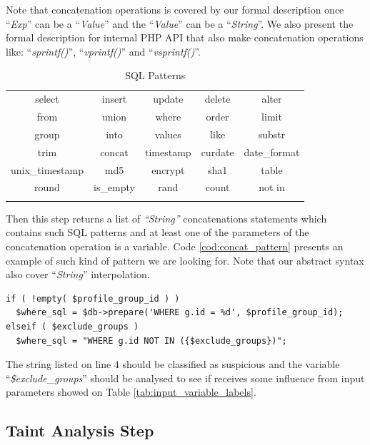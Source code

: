 Note that concatenation operations is covered by our formal description once ``\textit{Exp}'' can be a ``\textit{Value}'' and the ``\textit{Value}'' can be a ``\textit{String}''. We also present the formal description for internal PHP API that also make concatenation operations like: ``\textit{sprintf()}'', ``\textit{vprintf()}'' and ``\textit{vsprintf()}''.

\begin{table}[ht] 
\caption{SQL Patterns}
\centering
\begin{tabular}{c c c c c}
\hline\hline
select & insert & update & delete & alter \\
from & union & where & order & limit \\
group & into & values & like & substr \\
trim & concat & timestamp & curdate & date\_format \\
unix\_timestamp & md5 & encrypt & sha1 & table \\
round & is\_empty & rand & count & not in \\
\hline
\label{tab:sql_patterns}
\end{tabular}
\end{table}

Then this step returns a list of \textit{``String''} concatenations statements  which contains such SQL patterns and at least one of the parameters of the concatenation operation is a variable. Code \ref{cod:concat_pattern} presents an example of such kind of pattern we are looking for. Note that our abstract syntax also cover ``\textit{String}'' interpolation.

\begin{lstlisting}[caption=String concatenation statement pattern, label=cod:concat_pattern]
if ( !empty( $profile_group_id ) )
  $where_sql = $db->prepare('WHERE g.id = %d', $profile_group_id);
elseif ( $exclude_groups )
  $where_sql = "WHERE g.id NOT IN ({$exclude_groups})";
\end{lstlisting}

The string listed on line $4$ should be classified as suspicious and the variable ``\textit{\$exclude\_groups}'' should be analysed to see if receives some influence from input parameters showed on Table \ref{tab:input_variable_labels}.

\subsection{Taint Analysis Step}


